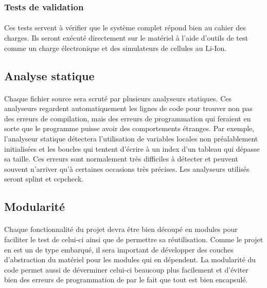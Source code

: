 		\subsubsection{Tests de validation}
		\paragraph{}
		Ces tests servent à vérifier que le système complet répond bien au cahier des charges. Ils seront exécuté directement sur le matériel à l’aide d’outils de test comme un charge électronique et des simulateurs de cellules au Li-Ion.

	\subsection{Analyse statique}
	\paragraph{}
	Chaque fichier source sera scruté par plusieurs analyseurs statiques. Ces analyseurs regardent automatiquement les lignes de code pour trouver non pas des erreurs de compilation, mais des erreurs de programmation qui feraient en sorte que le programme puisse avoir des comportements étranges. Par exemple, l’analyseur statique détectera l’utilisation de variables locales non préalablement initialisées et les boucles qui tentent d’écrire à un index d’un tableau qui dépasse sa taille. Ces erreurs sont normalement très difficiles à détecter et peuvent souvent n’arriver qu’à certaines occasions très précises. Les analyseurs utilisés seront splint et ccpcheck.

	\subsection{Modularité}
	\paragraph{}
	Chaque fonctionnalité du projet devra être bien découpé en modules pour faciliter le test de celui-ci ainsi que de permettre sa réutilisation. Comme le projet en est un de type embarqué, il sera important de développer des couches d’abstraction du matériel pour les modules qui en dépendent. La modularité du code permet aussi de déverminer celui-ci beaucoup plus facilement et d’éviter bien des erreurs de programmation de par le fait que tout est bien encapsulé.
